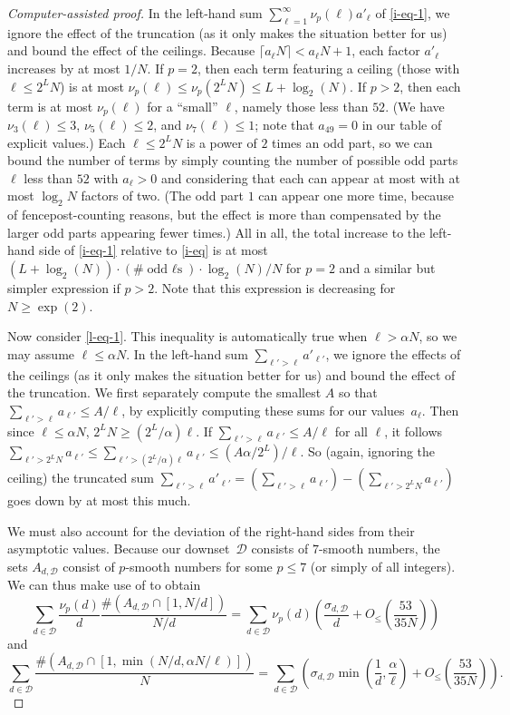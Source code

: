 \documentclass[12pt,a4paper,reqno]{amsart}
\numberwithin{equation}{section}
\theoremstyle{plain}
\theoremstyle{definition}
\begin{document}
\begin{proof}[Computer-assisted proof]
In the left-hand sum $\sum_{\ell=1}^\infty \nu_p(\ell) a'_\ell$ of \eqref{i-eq-1}, we ignore the effect of the truncation (as it only makes the situation better for us) and bound the effect of the ceilings.
Because $\lceil a_\ell N\rceil < a_\ell N+1$, each factor $a'_\ell$ increases by at most $1/N$.
If $p=2$, then each term featuring a ceiling (those with $\ell \le 2^L N$) is at most $\nu_p(\ell) \le \nu_p(2^L N) \le L+\log_2(N)$.
If $p>2$, then each term is at most $\nu_p(\ell)$ for a ``small'' $\ell$, namely those less than $52$.
(We have $\nu_3(\ell) \le 3$, $\nu_5(\ell) \le 2$, and $\nu_7(\ell) \le 1$; note that $a_{49}=0$ in our table of explicit values.)
Each $\ell\le 2^L N$ is a power of $2$ times an odd part, so we can bound the number of terms by simply counting the number of possible odd parts $\ell$ less than $52$ with $a_\ell>0$ and considering that each can appear at most with at most $\log_2 N$ factors of two.
(The odd part $1$ can appear one more time, because of fencepost-counting reasons, but the effect is more than compensated by the larger odd parts appearing fewer times.)
All in all, the total increase to the left-hand side of \eqref{i-eq-1} relative to \eqref{i-eq} is at most $(L+\log_2(N))\cdot (\#\text{odd $\ell$s})\cdot \log_2(N)/N$ for $p=2$ and a similar but simpler expression if $p>2$.
Note that this expression is decreasing for $N\ge\exp(2)$.

Now consider \eqref{l-eq-1}.
This inequality is automatically true when $\ell > \alpha N$, so we may assume $\ell \le \alpha N$.
In the left-hand sum $\sum_{\ell' > \ell} a'_{\ell'}$, we ignore the effects of the ceilings (as it only makes the situation better for us) and bound the effect of the truncation.
We first separately compute the smallest $A$ so that $\sum_{\ell' > \ell} a_{\ell'} \le A/\ell$, by explicitly computing these sums for our values~$a_{\ell}$.
Then since $\ell \le \alpha N$, $2^L N \ge (2^L/\alpha)\ell$.
If $\sum_{\ell' > \ell} a_{\ell'} \le A/\ell$ for all $\ell$, it follows $\sum_{\ell' > 2^L N} a_{\ell'} \le \sum_{\ell' > (2^L/\alpha)\ell} a_{\ell'} \le (A \alpha/2^L)/\ell$.
So (again, ignoring the ceiling) the truncated sum $\sum_{\ell' > \ell} a'_{\ell'} = (\sum_{\ell' > \ell} a_{\ell'}) - (\sum_{\ell' > 2^L N} a_{\ell'})$ goes down by at most this much.

We must also account for the deviation of the right-hand sides from their asymptotic values.
Because our downset~$\mathcal{D}$ consists of $7$-smooth numbers, the sets $A_{d,{\mathcal D}}$ consist of $p$-smooth numbers for some $p\le 7$ (or simply of all integers).
We can thus make use of  to obtain
$$ \sum_{d \in {\mathcal D}} \frac{\nu_p(d)}{d} \frac{\# (A_{d,{\mathcal D}} \cap [1,N/d])}{N/d} = \sum_{d \in {\mathcal D}} \nu_p(d)\left(\frac{\sigma_{d,{\mathcal D}}}{d} + O_{\le}\left(\frac{53}{35N}\right)\right) $$
and
$$ \sum_{d \in {\mathcal D}} \frac{\# (A_{d,{\mathcal D}} \cap [1,\min(N/d, \alpha N/\ell)])}{N} = \sum_{d \in {\mathcal D}} \left(\sigma_{d,{\mathcal D}} \min\left( \frac{1}{d}, \frac{\alpha}{\ell}\right) + O_{\le}\left(\frac{53}{35N}\right)\right) .$$


\end{proof}
\end{document}
